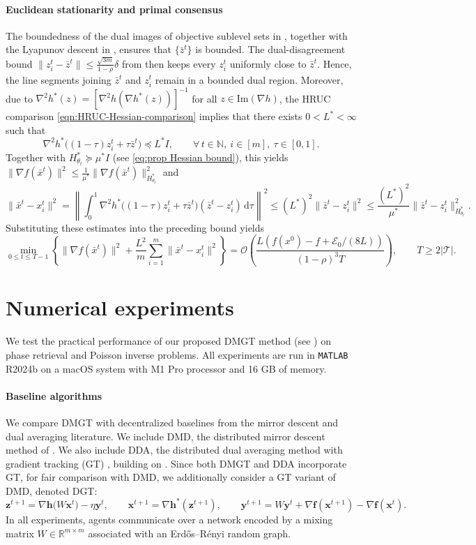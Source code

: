 \documentclass{article}
\theoremstyle{plain}
\theoremstyle{definition}
\theoremstyle{remark}
\newcommand{\N}{\mathbb{N}}
\newcommand{\sL}{L}
\newcommand{\cO}{\mathcal O}
\newcommand{\cE}{\mathcal E}
\newcommand{\bh}{\mathbf{h}}
\newcommand{\bx}{\mathbf{x}}
\newcommand{\by}{\mathbf{y}}
\newcommand{\bz}{\mathbf{z}}
\newcommand{\bff}{\mathbf{f}}
\begin{document}
 

\paragraph{Euclidean stationarity and primal consensus}
The boundedness of the dual images of objective sublevel sets in , together with the Lyapunov descent in , ensures that $\{\bar z^t\}$ is bounded. The dual-disagreement bound $\|z_i^t-\bar z^t\|\leq\frac{\sqrt{3m}}{1-\rho}\delta$ from  then keeps every $z_i^t$ uniformly close to $\bar z^t$. Hence, the line segments joining $\bar z^t$ and $z_i^t$ remain in a bounded dual region. Moreover, due to $\nabla^2h^*(z)=[\nabla^2h(\nabla h^*(z))]^{-1}$ for all $z\in\mathrm{Im}(\nabla h)$, the HRUC comparison \eqref{eqn:HRUC-Hessian-comparison} implies that there exists $0<L^*<\infty$ such that 
\[
\nabla^2h^*\big((1-\tau)z_i^t+\tau\bar z^t\big)\preceq L^*I,\qquad \forall\,t\in\N,\ i\in[m],\ \tau\in[0,1].
\]
Together with $H_{\theta_t}^*\succeq\mu^*I$ (see \eqref{eq:prop Hessian bound}), this yields $\|\nabla f(\bar x^t)\|^2
\leq \frac{1}{\mu^*}\|\nabla f(\bar x^t)\|_{H_{\theta_t}^*}^2$ and 
\[
\|\bar x^t-x_i^t\|^2
=\left\|\int_0^1\nabla^2h^*\big((1-\tau)z_i^t+\tau\bar z^t\big)(\bar z^t-z_i^t)\,\mathrm d\tau\right\|^2\leq (L^*)^2\|\bar z^t-z_i^t\|^2\leq \frac{(L^*)^2}{\mu^*}\|\bar z^t-z_i^t\|_{H_{\theta_t}^*}^2.
\]
Substituting these estimates into the preceding bound yields
\[
\min_{0\leq t\leq T-1}\left\{\|\nabla f(\bar x^t)\|^2+\frac{\sL^2}{m}{\sum}_{i=1}^m\|\bar x^t-x_i^t\|^2\right\}=\cO\left(\frac{\sL(f(x^0)-\underline f+\cE_0/(8\sL))}{(1-\rho)^3T}\right),\qquad T\geq2|\mathcal T|.
\] 
\section{Numerical experiments}\label{sec:experiment}
We test the practical performance of our proposed {\sf DMGT} method (see ) %
on phase retrieval and Poisson inverse problems. All experiments are run in \texttt{MATLAB} R2024b on a macOS system with M1 Pro processor and 16 GB of memory. 
\paragraph{Baseline algorithms}
We compare {\sf DMGT} with decentralized baselines from the mirror descent and dual averaging literature.
We include {\sf DMD}, the distributed mirror descent method of \cite{li2016distributed}.
We also include {\sf DDA}, the distributed dual averaging method with gradient tracking ({\sf GT}) \cite{liu2023rate}, building on \cite{duchi2011dual,Qu2018Harnessing}.
Since both {\sf DMGT} and {\sf DDA} incorporate GT, for fair comparison with {\sf DMD}, we additionally consider a {\sf GT} variant of {\sf DMD}, denoted {\sf DGT}:
$$
\bz^{t+1} = \nabla \bh\big(W\bx^t\big) - \eta\by^t,\qquad
\bx^{t+1} = \nabla \bh^*(\bz^{t+1}),\qquad
\by^{t+1} = W\by^t + \nabla \bff(\bx^{t+1}) - \nabla \bff(\bx^t).
$$
In all experiments, agents communicate over a network encoded by a mixing matrix $W\in\mathbb{R}^{m\times m}$ associated with an Erd\H{o}s--R\'enyi random graph.
\end{document}
